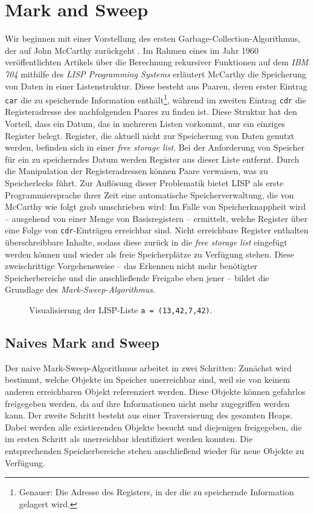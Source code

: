 \chapter{Mark and Sweep}
\label{cha:mark-sweep}
Wir beginnen mit einer Vorstellung des ersten Garbage-Collection-Algorithmus, der auf John McCarthy zurückgeht \cite[191--193]{mccarthy1960}.
Im Rahmen eines im Jahr 1960 veröffentlichten Artikels über die Berechnung rekursiver Funktionen auf dem \textit{IBM 704} mithilfe des \textit{LISP Programming Systems} erläutert McCarthy die Speicherung von Daten in einer Listenstruktur.
Diese besteht aus Paaren, deren erster Eintrag \texttt{car} die zu speichernde Information enthält\footnote{Genauer: Die Adresse des Registers, in der die zu speichernde Information gelagert wird.}, während im zweiten Eintrag \texttt{cdr} die Registeradresse des nachfolgenden Paares zu finden ist.
Diese Struktur hat den Vorteil, dass ein Datum, das in mehreren Listen vorkommt, nur ein einziges Register belegt.
Register, die aktuell nicht zur Speicherung von Daten genutzt werden, befinden sich in einer \textit{free storage list}.
Bei der Anforderung von Speicher für ein zu speicherndes Datum werden Register aus dieser Liste entfernt.
Durch die Manipulation der Registeradressen können Paare verwaisen, was zu Speicherlecks führt.
Zur Auflösung dieser Problematik bietet LISP als erste Programmiersprache ihrer Zeit eine automatische Speicherverwaltung, die von McCarthy wie folgt grob umschrieben wird:
Im Falle von Speicherknappheit wird -- ausgehend von einer Menge von Basisregistern -- ermittelt, welche Register über eine Folge von \texttt{cdr}-Einträgen erreichbar sind.
Nicht erreichbare Register enthalten überschreibbare Inhalte, sodass diese zurück in die \textit{free storage list} eingefügt werden können und wieder als freie Speicherplätze zu Verfügung stehen.
Diese zweischrittige Vorgehensweise -- das Erkennen nicht mehr benötigter Speicherbereiche und die anschließende Freigabe eben jener -- bildet die Grundlage des \textit{Mark-Sweep-Algorithmus}.

\begin{figure}[h]
	\centering
	
	\caption[Visualisierung einer LISP-Liste]{Visualisierung der LISP-Liste \texttt{a = (13,42,7,42)}.}
	\label{fig:lisp-list}
\end{figure}

\section{Naives Mark and Sweep}
\label{sec:naive-mark-sweep}
Der naive Mark-Sweep-Algorithmus arbeitet in zwei Schritten:
Zunächst wird bestimmt, welche Objekte im Speicher unerreichbar sind, weil sie von keinem anderen erreichbaren Objekt referenziert werden.
Diese Objekte können gefahrlos freigegeben werden, da auf ihre Informationen nicht mehr zugegriffen werden kann.
Der zweite Schritt besteht aus einer Traversierung des gesamten Heaps.
Dabei werden alle existierenden Objekte besucht und diejenigen freigegeben, die im ersten Schritt als unerreichbar identifiziert werden konnten.
Die entsprechenden Speicherbereiche stehen anschließend wieder für neue Objekte zu Verfügung.

